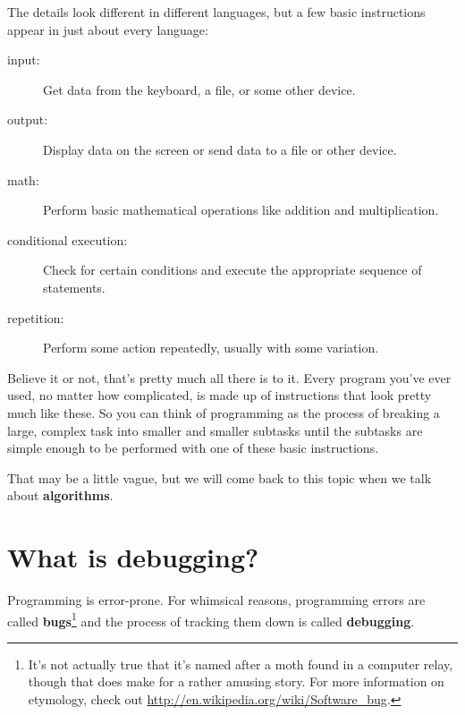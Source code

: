 \documentclass[10pt]{book}
\begin{document}

The details look different in different languages, but a few basic instructions appear in just about every 
language:

\begin{description}

\item[input:] Get data from the keyboard, a file, or some other device.

\item[output:] Display data on the screen or send data to a file or other device.

\item[math:] Perform basic mathematical operations like addition and multiplication.

\item[conditional execution:] Check for certain conditions and execute the appropriate sequence of statements.

\item[repetition:] Perform some action repeatedly, usually with some variation.

\end{description}

Believe it or not, that's pretty much all there is to it.  Every program you've ever used, no matter how 
complicated, is made up of instructions that look pretty much like these.  So you can think of programming 
as the process of breaking a large, complex task into smaller and smaller subtasks until the subtasks are 
simple enough to be performed with one of these basic instructions.


That may be a little vague, but we will come back to this topic when we talk about {\bf algorithms}.

\section{What is debugging?}

Programming is error-prone.  For whimsical reasons, programming errors are called {\bf bugs}\footnote{It's 
not actually true that it's named after a moth found in a computer relay, though that does make for a rather 
amusing story. For more information on etymology, check out \url{http://en.wikipedia.org/wiki/Software_bug}.} 
and the process of tracking them down is called {\bf debugging}.

\end{document}
